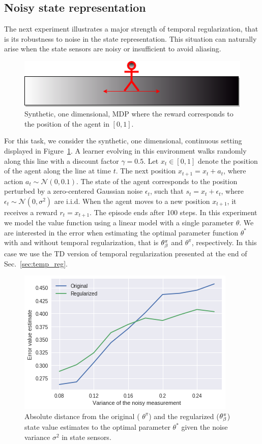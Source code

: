 \subsection{Noisy state representation}
\label{sec:expe:noisy_state}

The next experiment illustrates a major strength of temporal regularization, that is its robustness to noise in the state representation. This situation can naturally arise when the state sensors are noisy or insufficient to avoid aliasing.
\begin{figure}
    \centering
    \includegraphics[scale=0.7]{fig/random_walk.png}
    \caption{Synthetic, one dimensional, MDP where the reward corresponds to the position of the agent in $[0, 1]$.}
    \label{fig:MDP_noisy}
\end{figure}
For this task, we consider the synthetic, one dimensional, continuous setting displayed in Figure~\ref{fig:MDP_noisy}. A learner evolving in this environment walks randomly along this line with a discount factor $\gamma=0.5$. Let $x_t\in [0,1]$ denote the position of the agent along the line at time $t$. The next position $x_{t+1} = x_t + a_t$, where action $a_t\sim\mathcal{N}(0, 0.1)$. The state of the agent corresponds to the position perturbed by a zero-centered Gaussian noise $\epsilon_t$, such that $s_t = x_t + \epsilon_t$, where $\epsilon_t\sim\mathcal{N}(0,\sigma^2)$ are i.i.d. When the agent moves to a new position $x_{t+1}$, it receives a reward $r_t = x_{t+1}$. The episode ends after 100 steps. In this experiment we model the value function using a linear model with a single parameter $\theta$. We are interested in the error when estimating the optimal parameter function $\theta^*$ with and without temporal regularization, that is $\theta^\pi_\beta$ and $\theta^\pi$, respectively. In this case we use the TD version of temporal regularization presented at the end of Sec.~\ref{sec:temp_reg}.
\begin{figure}
    \centering
    \includegraphics[scale=0.7]{fig/spatial_temporal.png}
    \caption{Absolute distance from the original ( $\theta^\pi$) and the regularized ($\theta^\pi_\beta$) state value estimates to the optimal parameter $\theta^*$ given the noise variance $\sigma^2$ in state sensors.}
    \label{fig:perf_MDP_noisy}
\end{figure}
